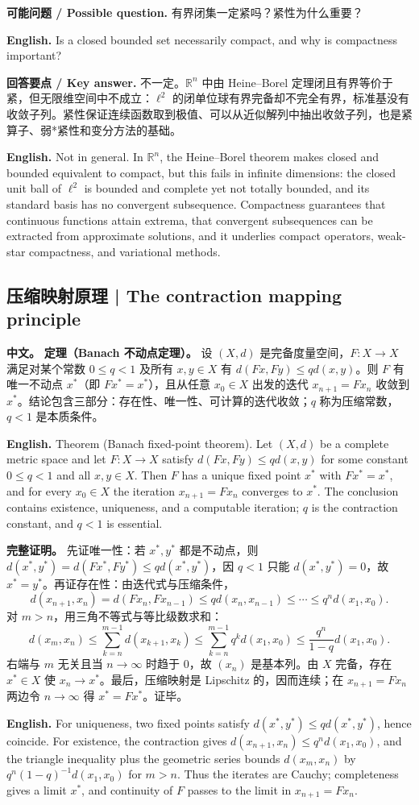 \documentclass[UTF8,11pt,a4paper]{ctexart}
\newcommand{\EN}[1]{\par\noindent \textbf{English.} #1\par}
\newcommand{\ASK}[4]{\par\noindent \textbf{可能问题 / Possible question.} #1\par\EN{#2}\noindent \textbf{回答要点 / Key answer.} #3\par\EN{#4}\smallskip}
\newcommand{\APS}[2]{\par\noindent\textbf{中文。} #1\par\noindent\textbf{English.} #2\par\smallskip}
\begin{document}
\ASK{有界闭集一定紧吗？紧性为什么重要？}{Is a closed bounded set necessarily compact, and why is compactness important?}{不一定。$\mathbb R^n$ 中由 Heine--Borel 定理闭且有界等价于紧，但无限维空间中不成立：$\ell^2$ 的闭单位球有界完备却不完全有界，标准基没有收敛子列。紧性保证连续函数取到极值、可以从近似解列中抽出收敛子列，也是紧算子、弱*紧性和变分方法的基础。}{Not in general. In $\mathbb R^n$, the Heine--Borel theorem makes closed and bounded equivalent to compact, but this fails in infinite dimensions: the closed unit ball of $\ell^2$ is bounded and complete yet not totally bounded, and its standard basis has no convergent subsequence. Compactness guarantees that continuous functions attain extrema, that convergent subsequences can be extracted from approximate solutions, and it underlies compact operators, weak-star compactness, and variational methods.}

\subsection{压缩映射原理 | The contraction mapping principle}
\APS{\textbf{定理（Banach 不动点定理）。} 设 $(X,d)$ 是完备度量空间，$F:X\to X$ 满足对某个常数 $0\le q<1$ 及所有 $x,y\in X$ 有 $d(Fx,Fy)\le qd(x,y)$。则 $F$ 有唯一不动点 $x^*$（即 $Fx^*=x^*$），且从任意 $x_0\in X$ 出发的迭代 $x_{n+1}=Fx_n$ 收敛到 $x^*$。结论包含三部分：存在性、唯一性、可计算的迭代收敛；$q$ 称为压缩常数，$q<1$ 是本质条件。}{Theorem (Banach fixed-point theorem). Let $(X,d)$ be a complete metric space and let $F:X\to X$ satisfy $d(Fx,Fy)\le qd(x,y)$ for some constant $0\le q<1$ and all $x,y\in X$. Then $F$ has a unique fixed point $x^*$ with $Fx^*=x^*$, and for every $x_0\in X$ the iteration $x_{n+1}=Fx_n$ converges to $x^*$. The conclusion contains existence, uniqueness, and a computable iteration; $q$ is the contraction constant, and $q<1$ is essential.}

\noindent\textbf{完整证明。} 先证唯一性：若 $x^*,y^*$ 都是不动点，则 $d(x^*,y^*)=d(Fx^*,Fy^*)\le qd(x^*,y^*)$，因 $q<1$ 只能 $d(x^*,y^*)=0$，故 $x^*=y^*$。再证存在性：由迭代式与压缩条件，
\[
d(x_{n+1},x_n)=d(Fx_n,Fx_{n-1})\le qd(x_n,x_{n-1})\le\cdots\le q^n d(x_1,x_0).
\]
对 $m>n$，用三角不等式与等比级数求和：
\[
d(x_m,x_n)\le\sum_{k=n}^{m-1}d(x_{k+1},x_k)
\le\sum_{k=n}^{m-1}q^k d(x_1,x_0)
\le\frac{q^n}{1-q}d(x_1,x_0).
\]
右端与 $m$ 无关且当 $n\to\infty$ 时趋于 $0$，故 $(x_n)$ 是基本列。由 $X$ 完备，存在 $x^*\in X$ 使 $x_n\to x^*$。最后，压缩映射是 Lipschitz 的，因而连续；在 $x_{n+1}=Fx_n$ 两边令 $n\to\infty$ 得 $x^*=Fx^*$。证毕。\EN{For uniqueness, two fixed points satisfy $d(x^*,y^*)\le qd(x^*,y^*)$, hence coincide. For existence, the contraction gives $d(x_{n+1},x_n)\le q^nd(x_1,x_0)$, and the triangle inequality plus the geometric series bounds $d(x_m,x_n)$ by $q^n(1-q)^{-1}d(x_1,x_0)$ for $m>n$. Thus the iterates are Cauchy; completeness gives a limit $x^*$, and continuity of $F$ passes to the limit in $x_{n+1}=Fx_n$.}
\end{document}
